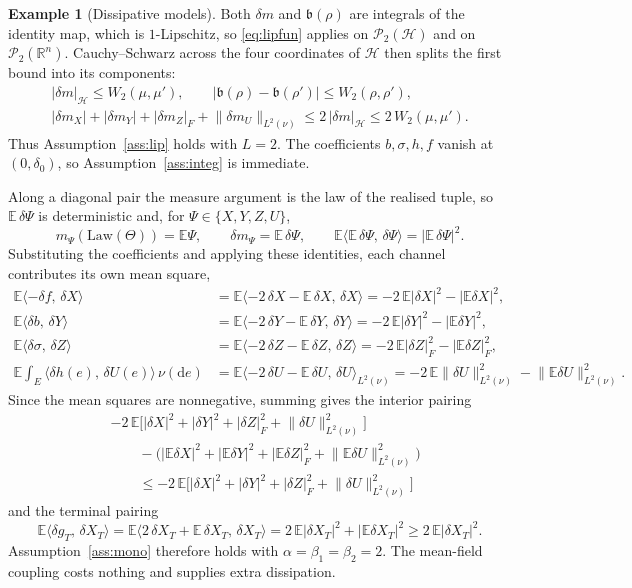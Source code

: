 \documentclass[preprint,12pt]{elsarticle}
\newcommand{\R}{\mathbb{R}}
\newcommand{\E}{\mathbb{E}}
\newcommand{\diff}{\mathrm{d}}
\newcommand{\inner}[2]{\langle #1,\,#2\rangle}
\newcommand{\Lnu}{L^2(\nu)}
\newcommand{\Law}{\mathrm{Law}}
\newcommand{\Lnorm}[1]{\lVert #1\rVert_{\Lnu}}
\numberwithin{equation}{section}
\theoremstyle{plain}
\theoremstyle{definition}
\theoremstyle{\PaperRemarkStyle}
\newtheorem{example}[theorem]{Example}
\begin{document}
\begin{example}[Dissipative models]
Both $\delta m$ and $\mathfrak b(\rho)$ are integrals of the identity map, which is
$1$-Lipschitz, so \eqref{eq:lipfun} applies on $\mathcal P_2(\mathcal H)$ and on
$\mathcal P_2(\R^n)$. Cauchy--Schwarz across the four coordinates of $\mathcal H$ then splits
the first bound into its components:
\[
\begin{gathered}
|\delta m|_{\mathcal H}\le W_2(\mu,\mu') ,\qquad
|\mathfrak b(\rho)-\mathfrak b(\rho')|\le W_2(\rho,\rho') ,\\[1.4ex]
|\delta m_X|+|\delta m_Y|+|\delta m_Z|_F+\Lnorm{\delta m_U}
\le 2\,|\delta m|_{\mathcal H}\le 2\,W_2(\mu,\mu') .
\end{gathered}
\]
Thus Assumption~\ref{ass:lip} holds with $L=2$. The coefficients $b,\sigma,h,f$ vanish at $(0,\delta_0)$, so Assumption~\ref{ass:integ} is
immediate.

Along a diagonal pair the measure argument is the law of the realised tuple, so
$\E\,\delta\Psi$ is deterministic and, for $\Psi\in\{X,Y,Z,U\}$,
\[
m_\Psi(\Law(\Theta))=\E\Psi,\qquad
\delta m_\Psi=\E\,\delta\Psi,\qquad
\E\inner{\E\,\delta\Psi}{\delta\Psi}=|\E\,\delta\Psi|^2 .
\]
Substituting the coefficients and applying these identities, each channel contributes its own
mean square,
\[
\begin{aligned}
\E\inner{-\delta f}{\delta X}
&=\E\inner{-2\,\delta X-\E\,\delta X}{\delta X}=-2\,\E|\delta X|^2-|\E\delta X|^2,\\
\E\inner{\delta b}{\delta Y}
&=\E\inner{-2\,\delta Y-\E\,\delta Y}{\delta Y}=-2\,\E|\delta Y|^2-|\E\delta Y|^2,\\
\E\inner{\delta\sigma}{\delta Z}
&=\E\inner{-2\,\delta Z-\E\,\delta Z}{\delta Z}=-2\,\E|\delta Z|_F^2-|\E\delta Z|_F^2,\\
\E\!\int_E\!\inner{\delta h(e)}{\delta U(e)}\,\nu(\diff e)
&=\E\inner{-2\,\delta U-\E\,\delta U}{\delta U}_{\Lnu}
=-2\,\E\Lnorm{\delta U}^2-\Lnorm{\E\delta U}^2 .
\end{aligned}
\]
Since the mean squares are nonnegative, summing gives the interior pairing
\[
\begin{aligned}
&-2\,\E\big[|\delta X|^2+|\delta Y|^2+|\delta Z|_F^2+\Lnorm{\delta U}^2\big]\\
&\qquad-\big(|\E\delta X|^2+|\E\delta Y|^2+|\E\delta Z|_F^2+\Lnorm{\E\delta U}^2\big)\\
&\qquad\le-2\,\E\big[|\delta X|^2+|\delta Y|^2+|\delta Z|_F^2+\Lnorm{\delta U}^2\big]
\end{aligned}
\]
and the terminal pairing
\[
\E\inner{\delta g_T}{\delta X_T}
=\E\inner{2\,\delta X_T+\E\,\delta X_T}{\delta X_T}
=2\,\E|\delta X_T|^2+|\E\delta X_T|^2
\ge2\,\E|\delta X_T|^2 .
\]
Assumption~\ref{ass:mono} therefore holds with $\alpha=\beta_1=\beta_2=2$. The mean-field
coupling costs nothing and supplies extra dissipation.


\end{example}
\end{document}
